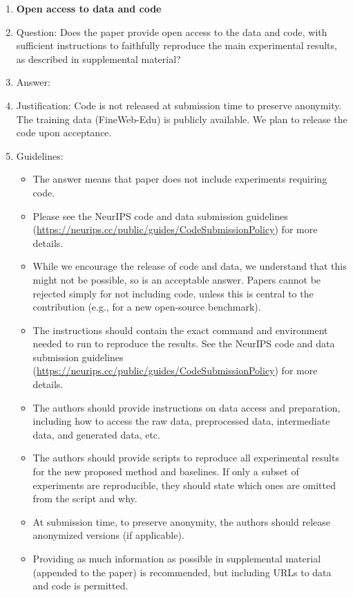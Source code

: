 \documentclass{article}
\begin{document}
\begin{enumerate}
\item {\bf Open access to data and code}
    \item[] Question: Does the paper provide open access to the data and code, with sufficient instructions to faithfully reproduce the main experimental results, as described in supplemental material?
    \item[] Answer: \answerNo{}
    \item[] Justification: Code is not released at submission time to preserve anonymity. The training data (FineWeb-Edu) is publicly available. We plan to release the code upon acceptance.
    \item[] Guidelines:
    \begin{itemize}
        \item The answer \answerNA{} means that paper does not include experiments requiring code.
        \item Please see the NeurIPS code and data submission guidelines (\url{https://neurips.cc/public/guides/CodeSubmissionPolicy}) for more details.
        \item While we encourage the release of code and data, we understand that this might not be possible, so \answerNo{} is an acceptable answer. Papers cannot be rejected simply for not including code, unless this is central to the contribution (e.g., for a new open-source benchmark).
        \item The instructions should contain the exact command and environment needed to run to reproduce the results. See the NeurIPS code and data submission guidelines (\url{https://neurips.cc/public/guides/CodeSubmissionPolicy}) for more details.
        \item The authors should provide instructions on data access and preparation, including how to access the raw data, preprocessed data, intermediate data, and generated data, etc.
        \item The authors should provide scripts to reproduce all experimental results for the new proposed method and baselines. If only a subset of experiments are reproducible, they should state which ones are omitted from the script and why.
        \item At submission time, to preserve anonymity, the authors should release anonymized versions (if applicable).
        \item Providing as much information as possible in supplemental material (appended to the paper) is recommended, but including URLs to data and code is permitted.
    \end{itemize}



\end{enumerate}
\end{document}
